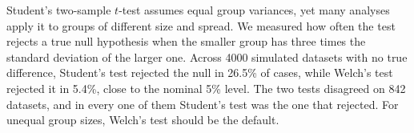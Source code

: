 Student's two-sample $t$-test assumes equal group variances, yet many analyses apply it to groups of different size and spread. We measured how often the test rejects a true null hypothesis when the smaller group has three times the standard deviation of the larger one. Across 4000 simulated datasets with no true difference, Student's test rejected the null in 26.5\% of cases, while Welch's test rejected it in 5.4\%, close to the nominal 5\% level. The two tests disagreed on 842 datasets, and in every one of them Student's test was the one that rejected. For unequal group sizes, Welch's test should be the default.
